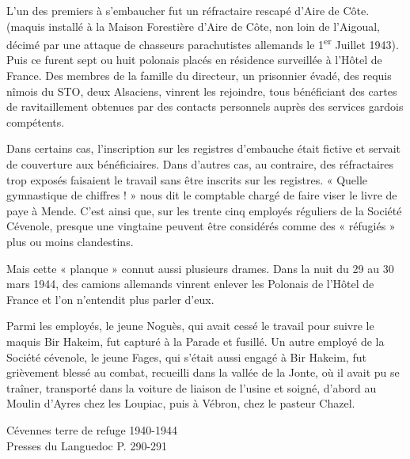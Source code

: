 \vspace{0.45cm}

L’un des premiers à s’embaucher fut un réfractaire rescapé d’Aire de Côte. (maquis
installé à la Maison Forestière d’Aire de Côte, non loin de l’Aigoual, décimé par une
attaque de chasseurs parachutistes allemands le 1\textsuperscript{er} Juillet 1943).
Puis ce furent sept ou huit polonais placés en résidence surveillée à l’Hôtel de France.
Des membres de la famille du directeur, un prisonnier évadé, des requis nîmois du STO,
deux Alsaciens, vinrent les rejoindre, tous bénéficiant des cartes de ravitaillement
obtenues par des contacts personnels auprès des services gardois compétents.

\vspace{0.45cm}

Dans certains cas, l’inscription sur les registres d’embauche était fictive et servait de
couverture aux bénéficiaires. Dans d’autres cas, au contraire, des réfractaires trop
exposés faisaient le travail sans être inscrits sur les registres. « Quelle gymnastique
de chiffres ! » nous dit le comptable chargé de faire viser le livre de paye à Mende.
C’est ainsi que, sur les trente cinq employés réguliers de la Société Cévenole,
presque une vingtaine peuvent être considérés comme des « réfugiés » plus ou moins
clandestins.

\vspace{0.45cm}

Mais cette « planque » connut aussi plusieurs drames. Dans la nuit du 29 au 30 mars
1944, des camions allemands vinrent enlever les Polonais de l’Hôtel de France et
l’on n’entendit plus parler d’eux.

\vspace{0.45cm}

Parmi les employés, le jeune Noguès, qui avait cessé le travail pour suivre le maquis
Bir Hakeim, fut capturé à la Parade et fusillé. Un autre employé de la Société
cévenole, le jeune Fages, qui s’était aussi engagé à Bir Hakeim, fut grièvement
blessé au combat, recueilli dans la vallée de la Jonte, où il avait pu se traîner,
transporté dans la voiture de liaison de l’usine et soigné, d’abord au Moulin d’Ayres
chez les Loupiac, puis à Vébron, chez le pasteur Chazel.

\vfill

\begin{flushright}
Cévennes terre de refuge 1940-1944\\
Presses du Languedoc P. 290-291
\end{flushright}

